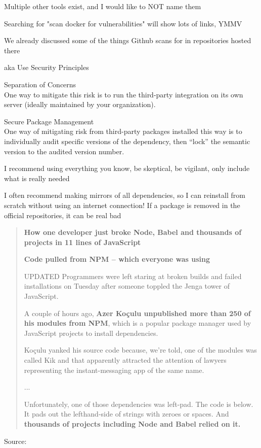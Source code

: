 \documentclass[Screen16to9,17pt]{foils}
\begin{document}
\begin{list2}
\item Multiple other tools exist, and I would like to NOT name them
\item Searching for "scan docker for vulnerabilities" will show lots of links, YMMV
\item We already discussed some of the things Github scans for in repositories hosted there
\end{list2}



{\Large aka Use Security Principles}

\begin{list2}
\item Separation of Concerns\\
One way to mitigate this risk is to run the third-party integration on its
own server (ideally maintained by your organization).
\item Secure Package Management\\
One way of mitigating risk from
third-party packages installed this way is to individually audit specific versions of the
dependency, then “lock” the semantic version to the audited version number.
\end{list2}

I recommend using everything you know, be skeptical, be vigilant, only include what is really needed

I often recommend making mirrors of all dependencies, so I can reinstall from scratch without using an internet connection! If a package is removed in the official repositories, it can be real bad

\slide{}


\begin{quote}
{\Large \bf How one developer just broke Node, Babel and thousands of projects in 11 lines of JavaScript}

{\bf Code pulled from NPM – which everyone was using}

UPDATED Programmers were left staring at broken builds and failed installations on Tuesday after someone toppled the Jenga tower of JavaScript.

A couple of hours ago, {\bf Azer Koçulu unpublished more than 250 of his modules from NPM}, which is a popular package manager used by JavaScript projects to install dependencies.

Koçulu yanked his source code because, we're told, one of the modules was called Kik and that apparently attracted the attention of lawyers representing the instant-messaging app of the same name.

...

Unfortunately, one of those dependencies was left-pad. The code is below. It pads out the lefthand-side of strings with zeroes or spaces. And {\bf thousands of projects including Node and Babel relied on it.}
\end{quote}
Source: 
\end{document}
